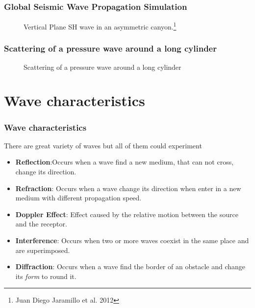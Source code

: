 \documentclass{beamer}
\begin{document}
\begin{frame}\frametitle{Global Seismic Wave Propagation Simulation}
\begin{figure}[H]
\centering
{}
\caption{Vertical Plane SH wave in an asymmetric canyon.\footnote{Juan Diego Jaramillo et al. 2012}}
\label{vid:canyon}
\end{figure}
\end{frame}

\begin{frame}\frametitle{Scattering of a pressure wave around a long cylinder}
\begin{figure}[H]
\centering
{}
\caption{Scattering of a pressure wave around a long cylinder }
\label{vid:cylinder}
\end{figure}
\end{frame}

\section{Wave characteristics}
\begin{frame}
	\frametitle{Wave characteristics}
There are great variety of waves but all of them could experiment
\begin{itemize}
\item \textbf{Reflection}:Occurs when a wave find a new medium, that can not cross, change its direction.

\item \textbf{Refraction}: Occurs when a wave change its direction when enter in a new medium with different propagation speed.

\item \textbf{Doppler Effect}: Effect caused by the relative motion between the source and the receptor.

\item \textbf{Interference}: Occurs when two or more waves coexist in the same place and are superimposed.

\item \textbf{Diffraction}: Occurs when a wave find the border of an obstacle and change its \emph{form} to round it.
\end{itemize}

\end{frame}
\end{document}
